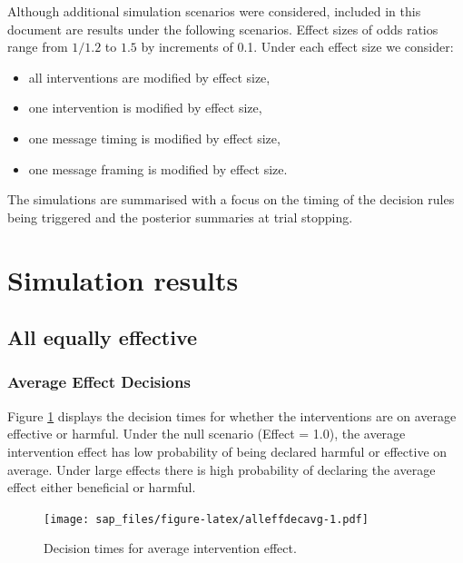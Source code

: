 \documentclass[
  bibliography=totoc]{scrreprt}
\providecommand{\tightlist}{%
  \setlength{\itemsep}{0pt}\setlength{\parskip}{0pt}}
\begin{document}
Although additional simulation scenarios were considered, included in this document are results under the following scenarios.
Effect sizes of odds ratios range from \(1/1.2\) to \(1.5\) by increments of 0.1.
Under each effect size we consider:

\begin{itemize}
\tightlist
\item
  all interventions are modified by effect size,
\item
  one intervention is modified by effect size,
\item
  one message timing is modified by effect size,
\item
  one message framing is modified by effect size.
\end{itemize}

The simulations are summarised with a focus on the timing of the decision rules being triggered and the posterior summaries at trial stopping.

\clearpage

\hypertarget{simulation-results}{%
\section{Simulation results}\label{simulation-results}}

\hypertarget{all-equally-effective}{%
\subsection{All equally effective}\label{all-equally-effective}}

\hypertarget{average-effect-decisions}{%
\subsubsection{Average Effect Decisions}\label{average-effect-decisions}}

Figure \ref{fig:alleffdecavg} displays the decision times for whether the interventions are on average effective or harmful.
Under the null scenario (Effect = 1.0), the average intervention effect has low probability of being declared harmful or effective on average.
Under large effects there is high probability of declaring the average effect either beneficial or harmful.

\begin{figure}
\centering
\texttt{[image: sap\_files/figure-latex/alleffdecavg-1.pdf]}
\caption{\label{fig:alleffdecavg}Decision times for average intervention effect.}
\end{figure}
\end{document}
